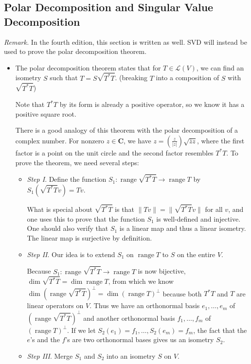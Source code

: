 \documentclass[11pt]{article}
\newcommand{\C}{\mathbf{C}}
\renewcommand{\r}{\operatorname{range}}
\renewcommand{\d}{\dim}
\newcommand{\conj}[1]{\overline{#1}}
\newcommand{\nm}[1]{\|#1\|}
\newcommand{\abs}[1]{\lvert #1 \rvert}
\newcommand{\LV}{\mathcal{L}(V)}
\begin{document}
\subsection{Polar Decomposition and Singular Value Decomposition}
\textit{Remark.} In the fourth edition, this section is written as well. SVD will instead be used to prove the polar decomposition theorem.
\begin{itemize}
\item The polar decomposition theorem states that for $T \in \LV$, we can find an isometry $S$ such that $T = S \sqrt{T^*T}$. (breaking $T$ into a composition of $S$ with $\sqrt{T^*T}$)

Note that $T^*T$ by its form is already a positive operator, so we know it has a positive square root.

There is a good analogy of this theorem with the polar decomposition of a complex number. For nonzero $z \in \C$, we have $z = \left(\frac{z}{\abs{z}}\right)\sqrt{\conj{z}z}$, where the first factor is a point on the unit circle and the second factor resembles $T^*T$. To prove the theorem, we need several steps:
\begin{itemize}
    \item \textit{Step I}. Define the function $S_1: \r \sqrt{T^*T} \to \r T$ by $S_1(\sqrt{T^*T}v)=Tv$.
    
    What is special about $\sqrt{T^*T}$ is that $\nm{Tv}=\nm{\sqrt{T^*T}v}$ for all $v$, and one uses this to prove that the function $S_1$ is well-defined and injective. One should also verify that $S_1$ is a linear map and thus a linear isometry. The linear map is surjective by definition.
    
    \item \textit{Step II}. Our idea is to extend $S_1$ on $\r T$ to $S$ on the entire $V$. 
    
    Because $S_1: \r \sqrt{T^*T} \to \r T$ is now bijective, $\d \sqrt{T^*T} = \d \r T$, from which we know $\d(\r \sqrt{T^*T})^\perp = \d(\r T)^\perp$ because both $T^*T$ and $T$ are linear operators on $V$. Thus we have an orthonormal basis $e_1,\dots,e_m$ of $(\r \sqrt{T^*T})^\perp$ and another orthonormal basis $f_1,\dots,f_m$ of $(\r T)^\perp$. If we let $S_2(e_1) = f_1,\dots,S_2(e_m)=f_m$, the fact that the $e$'s and the $f$'s are two orthonormal bases gives us an isometry $S_2$.
    
    \item \textit{Step III}. Merge $S_1$ and $S_2$ into an isometry $S$ on $V$.
    

\end{itemize}
\end{itemize}
\end{document}
